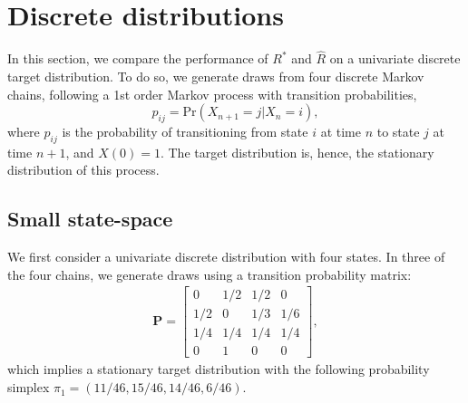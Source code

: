 \documentclass{article}
\begin{document}
\section{Discrete distributions}\label{sec:discrete}
In this section, we compare the performance of $R^*$ and $\widehat{R}$ on a univariate discrete target distribution. To do so, we generate draws from four discrete Markov chains, following a 1st order Markov process with transition probabilities,
%
\begin{equation}
p_{ij} = \text{Pr}(X_{n+1}=j|X_n=i),
\end{equation}
%
where $p_{ij}$ is the probability of transitioning from state $i$ at time $n$ to state $j$ at time $n+1$, and $X(0)=1$. The target distribution is, hence, the stationary distribution of this process.

\subsection{Small state-space}\label{sec:discrete_small}
We first consider a univariate discrete distribution with four states. In three of the four chains, we generate draws using a transition probability matrix:
%
\begin{gather}
\boldsymbol{P}
=
\begin{bmatrix}
0 & 1/2 & 1/2 & 0\\
1/2 & 0 & 1/3 & 1/6\\
1/4 & 1/4 & 1/4 & 1/4\\
0 & 1 & 0 & 0
\end{bmatrix},
\end{gather}
%
which implies a stationary target distribution with the following probability simplex $\pi_1 = (11/46, 15/46, 14/46, 6/46)$.
\end{document}

